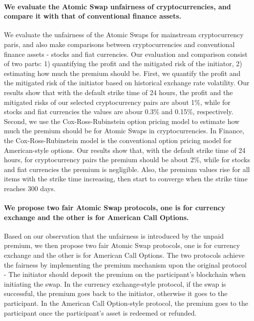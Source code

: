 \paragraph{We evaluate the Atomic Swap unfairness of cryptocurrencies, and compare it with that of conventional finance assets.}
We evaluate the unfairness of the Atomic Swaps for mainstream cryptocurrency paris, and also make comparisons between cryptocurrencies and conventional finance assets - stocks and fiat currencies.
Our evaluation and comparison consist of two parts: 1) quantifying the profit and the mitigated risk of the initiator, 2) estimating how much the premium should be.
First, we quantify the profit and the mitigated risk of the initiator based on historical exchange rate volatility.
Our results show that with the default strike time of 24 hours, the profit and the mitigated risks of our selected cryptocurrency pairs are about 1\%, while for stocks and fiat currencies the values are abour 0.3\% and 0.15\%, respectively.
Second, we use the Cox-Ross-Rubinstein option pricing model to estimate how much the premium should be for Atomic Swaps in cryptocurrencies.
In Finance, the Cox-Ross-Rubinstein model is the conventional option pricing model for American-style options.
Our results show that, with the default strike time of 24 hours, for cryptocurrency pairs the premium should be about 2\%, while for stocks and fiat currencies the premium is negligible.
Also, the premium values rise for all items with the strike time increasing, then start to converge when the strike time reaches 300 days.

\paragraph{We propose two fair Atomic Swap protocols, one is for currency exchange and the other is for American Call Options.}
Based on our observation that the unfairness is introduced by the unpaid premium,
we then propose two fair Atomic Swap protocols, one is for currency exchange and the other is for American Call Options.
The two protocols achieve the fairness by implementing the premium mechanism upon the original protocol - The initiator should deposit the premium on the participant's blockchain when initiating the swap.
In the currency exchange-style protocol, if the swap is successful, the premium goes back to the initiator, otherwise it goes to the participant.
In the American Call Option-style protocol, the premium goes to the participant once the participant's asset is redeemed or refunded.

